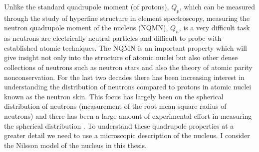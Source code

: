 \documentclass[10pt,a4paper, twoside, openright]{report}
\begin{document}
Unlike the standard quadrupole moment (of protons), $Q_p$, which can be measured through the study of hyperfine structure in element spectroscopy, measuring the neutron quadrupole moment of the nucleus (NQMN), $Q_{n}$,  is a very difficult  task as neutrons are electrically neutral particles and difficult to probe with established atomic techniques. The  NQMN is an important property which will give insight not only into the structure of  atomic nuclei but also other dense collections of neutrons such as neutron stars \cite{Brown2000, Furnstahl2002, Typel2001, Reinhard2010} and also the theory of atomic parity nonconservation. For the last two decades there has been increasing interest in understanding the distribution of neutrons compared to protons in atomic nuclei known as the neutron skin. This focus has largely been on the spherical distribution of neutrons (measurement of the root mean square radius of neutrons) and there has been a large amount of experimental effort in measuring the spherical distribution \cite{Clark2003, Trzcinska2001, Lenske2009, Abrahamyan2012}. To understand these quadrupole properties at a greater detail we need to use a microscopic description of the nucleus. I consider the Nilsson model of the nucleus in this thesis.
\end{document}
